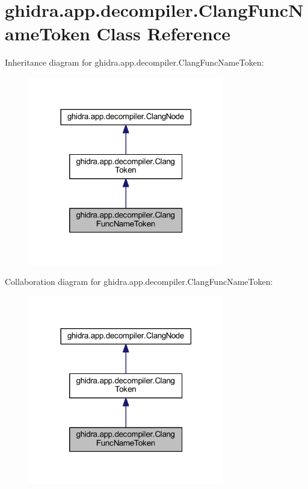 \hypertarget{classghidra_1_1app_1_1decompiler_1_1_clang_func_name_token}{}\section{ghidra.\+app.\+decompiler.\+Clang\+Func\+Name\+Token Class Reference}
\label{classghidra_1_1app_1_1decompiler_1_1_clang_func_name_token}


Inheritance diagram for ghidra.\+app.\+decompiler.\+Clang\+Func\+Name\+Token\+:
\nopagebreak
\begin{figure}[H]
\begin{center}
\leavevmode
\includegraphics[width=242pt]{classghidra_1_1app_1_1decompiler_1_1_clang_func_name_token__inherit__graph}
\end{center}
\end{figure}


Collaboration diagram for ghidra.\+app.\+decompiler.\+Clang\+Func\+Name\+Token\+:
\nopagebreak
\begin{figure}[H]
\begin{center}
\leavevmode
\includegraphics[width=242pt]{classghidra_1_1app_1_1decompiler_1_1_clang_func_name_token__coll__graph}
\end{center}
\end{figure}
